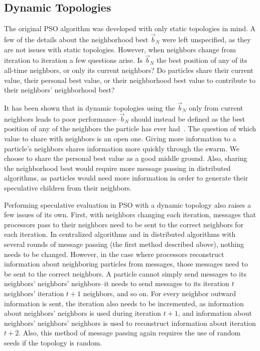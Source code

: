 \documentclass[conference,letterpaper]{IEEEtran}
\providecommand{\nbest}{\ensuremath{\Vec{b}_N}}
\begin{document}
\subsection{Dynamic Topologies}

The original PSO algorithm was developed with only static topologies in mind. A
few of the details about the neighborhood best $\nbest$ were left unspecified,
as they are not issues with static topologies.  However, when neighbors change
from iteration to iteration a few questions arise.  Is $\nbest$ the best
position of any of its all-time neighbors, or only its current neighbors?  Do
particles share their current value, their personal best value, or their
neighborhood best value to contribute to their neighbors' neighborhood best?

It has been shown that in dynamic topologies using the $\nbest$ only from
current neighbors leads to poor performance--$\nbest$ should instead be defined
as the best position of any of the neighbors the particle has ever
had~\cite{mcnabb-cec09}.  The question of which value to share with neighbors
is an open one.  Giving more information to a particle's neighbors shares
information more quickly through the swarm.  We choose to share the personal
best value as a good middle ground.  Also, sharing the neighborhood best would
require more message passing in distributed algorithms, as particles would need
more information in order to generate their speculative children from their
neighbors.

Performing speculative evaluation in PSO with a dynamic topology also raises a
few issues of its own.  First, with neighbors changing each iteration, messages
that processors pass to their neighbors need to be sent to the correct
neighbors for each iteration.  In centralized algorithms and in distributed
algorithms with several rounds of message passing (the first method described
above), nothing needs to be changed.  However, in the case where processors
reconstruct information about neighboring particles from messages, those
messages need to be sent to the correct neighbors.  A particle cannot simply
send messages to its neighbors' neighbors' neighbors--it needs to send messages
to its iteration $t$ neighbors' iteration $t+1$ neighbors, and so on.  For
every neighbor outward information is sent, the iteration also needs to be
incremented, as information about neighbors' neighbors is used during iteration
$t+1$, and information about neighbors' neighbors' neighbors is used to
reconstruct information about iteration $t+2$.  Also, this method of message
passing again requires the use of random seeds if the topology is random.
\end{document}
